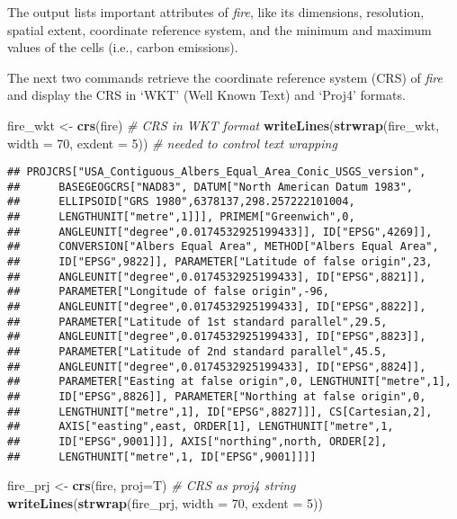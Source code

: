 \documentclass[
]{article}
\newenvironment{Shaded}{\begin{snugshade}}{\end{snugshade}}
\newcommand{\AttributeTok}[1]{\textcolor[rgb]{0.13,0.29,0.53}{#1}}
\newcommand{\CommentTok}[1]{\textcolor[rgb]{0.56,0.35,0.01}{\textit{#1}}}
\newcommand{\DecValTok}[1]{\textcolor[rgb]{0.00,0.00,0.81}{#1}}
\newcommand{\FunctionTok}[1]{\textcolor[rgb]{0.13,0.29,0.53}{\textbf{#1}}}
\newcommand{\NormalTok}[1]{#1}
\newcommand{\OtherTok}[1]{\textcolor[rgb]{0.56,0.35,0.01}{#1}}
\begin{document}
The output lists important attributes of \emph{fire}, like its
dimensions, resolution, spatial extent, coordinate reference system, and
the minimum and maximum values of the cells (i.e., carbon emissions).

The next two commands retrieve the coordinate reference system (CRS) of
\emph{fire} and display the CRS in `WKT' (Well Known Text) and `Proj4'
formats.

\begin{Shaded}
\begin{Highlighting}[]
\NormalTok{fire\_wkt }\OtherTok{\textless{}{-}} \FunctionTok{crs}\NormalTok{(fire)  }\CommentTok{\# CRS in WKT format}
\FunctionTok{writeLines}\NormalTok{(}\FunctionTok{strwrap}\NormalTok{(fire\_wkt, }\AttributeTok{width =} \DecValTok{70}\NormalTok{, }\AttributeTok{exdent =} \DecValTok{5}\NormalTok{)) }\CommentTok{\# needed to control text wrapping}
\end{Highlighting}
\end{Shaded}

\begin{verbatim}
## PROJCRS["USA_Contiguous_Albers_Equal_Area_Conic_USGS_version",
##      BASEGEOGCRS["NAD83", DATUM["North American Datum 1983",
##      ELLIPSOID["GRS 1980",6378137,298.257222101004,
##      LENGTHUNIT["metre",1]]], PRIMEM["Greenwich",0,
##      ANGLEUNIT["degree",0.0174532925199433]], ID["EPSG",4269]],
##      CONVERSION["Albers Equal Area", METHOD["Albers Equal Area",
##      ID["EPSG",9822]], PARAMETER["Latitude of false origin",23,
##      ANGLEUNIT["degree",0.0174532925199433], ID["EPSG",8821]],
##      PARAMETER["Longitude of false origin",-96,
##      ANGLEUNIT["degree",0.0174532925199433], ID["EPSG",8822]],
##      PARAMETER["Latitude of 1st standard parallel",29.5,
##      ANGLEUNIT["degree",0.0174532925199433], ID["EPSG",8823]],
##      PARAMETER["Latitude of 2nd standard parallel",45.5,
##      ANGLEUNIT["degree",0.0174532925199433], ID["EPSG",8824]],
##      PARAMETER["Easting at false origin",0, LENGTHUNIT["metre",1],
##      ID["EPSG",8826]], PARAMETER["Northing at false origin",0,
##      LENGTHUNIT["metre",1], ID["EPSG",8827]]], CS[Cartesian,2],
##      AXIS["easting",east, ORDER[1], LENGTHUNIT["metre",1,
##      ID["EPSG",9001]]], AXIS["northing",north, ORDER[2],
##      LENGTHUNIT["metre",1, ID["EPSG",9001]]]]
\end{verbatim}

\begin{Shaded}
\begin{Highlighting}[]
\NormalTok{fire\_prj }\OtherTok{\textless{}{-}} \FunctionTok{crs}\NormalTok{(fire, }\AttributeTok{proj=}\NormalTok{T)  }\CommentTok{\# CRS as proj4 string}
\FunctionTok{writeLines}\NormalTok{(}\FunctionTok{strwrap}\NormalTok{(fire\_prj, }\AttributeTok{width =} \DecValTok{70}\NormalTok{, }\AttributeTok{exdent =} \DecValTok{5}\NormalTok{)) }
\end{Highlighting}
\end{Shaded}
\end{document}
